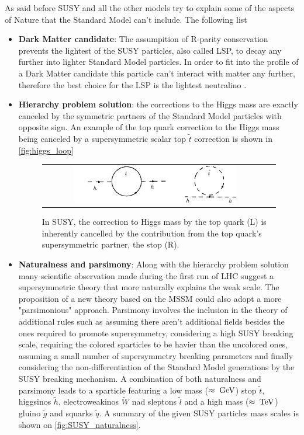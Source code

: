 \FloatBarrier

As said before SUSY and all the other models try to explain some of the aspects of Nature that the Standard Model can't include. The following list 

\begin{itemize}
	\item \textbf{Dark Matter candidate}: The assumpition of R-parity conservation prevents the lightest of the SUSY particles, also called LSP, to decay any further into lighter Standard Model particles. In order to fit into the profile of a Dark Matter candidate this particle can't interact with matter any further, therefore the best choice for the LSP is the lightest neutralino \neutralinoone.  
	
	\item \textbf{Hierarchy problem solution}:  the corrections to the Higgs mass are exactly canceled by the symmetric partners of the Standard Model particles with opposite sign. An example of the top quark correction to the Higgs mass being canceled by a supersymmetric scalar top $\widetilde{t}$ correction is shown in \autoref{fig:higgs_loop}
	
	\begin{figure}[tbh!]
		\centering
		\begin{tabular}{cc}
			\includegraphics[width=0.75\textwidth]{theory/pics/higgs_loop.png}
		\end{tabular}
		\caption{In SUSY, the correction to Higgs mass by the top quark (L) is inherently cancelled by the contribution from the top quark's supersymmetric partner, the stop (R).}
		\label{fig:higgs_loop}
	\end{figure}

	\item \textbf{Naturalness and parsimony}: Along with the hierarchy problem solution many scientific observation made during the first run of LHC suggest a supersymmetric theory that more naturally explains the weak scale\cite{Craig:2013cxa}. The proposition of a new theory based on the MSSM could also adopt a more "parsimonious" approach. Parsimony involves the inclusion in the theory of additional rules such as assuming there aren't additional fields besides the ones required to promote supersymmetry, considering a high SUSY breaking scale, requiring the colored sparticles to be havier than the uncolored ones, assuming a small number of supersymmetry breaking parameters and finally considering the non-differentiation of the Standard Model generations by the SUSY breaking mechanism. A combination of both naturalness and parsimony leads to a sparticle featuring a low mass ($\approx\;\text{Ge}\kern-0.06667em\text{V}$) stop $\widetilde{t}$, higgsinos $\widetilde{h}$, electroweakinos $\widetilde{W}$ nad sleptons $\widetilde{l}$ and a high mass ($\approx\;\text{Te}\kern-0.06667em\text{V}$) gluino $\widetilde{g}$ and squarks $\widetilde{q}$. A summary of the given SUSY particles mass scales is shown on \autoref{fig:SUSY_naturalness}.


\end{itemize}
